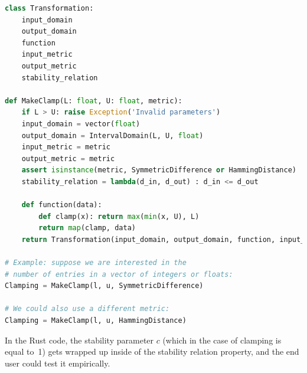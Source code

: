 \documentclass[11pt,a4paper]{article}
\theoremstyle{definition}
\newcommand{\din}{\texttt{d\_in}}
\newcommand{\dout}{\texttt{d\_out}}
\newcommand{\silvia}[1]{{ {\color{blue}{(silvia)~#1}}}}
\begin{document}
\begin{lstlisting}[language=Python]
class Transformation:
    input_domain
    output_domain
    function
    input_metric
    output_metric
    stability_relation 

def MakeClamp(L: float, U: float, metric):
    if L > U: raise Exception('Invalid parameters')
    input_domain = vector(float) 
    output_domain = IntervalDomain(L, U, float)
    input_metric = metric
    output_metric = metric
    assert isinstance(metric, SymmetricDifference or HammingDistance)
    stability_relation = lambda(d_in, d_out) : d_in <= d_out
    
    def function(data):
        def clamp(x): return max(min(x, U), L)
        return map(clamp, data) 
    return Transformation(input_domain, output_domain, function, input_metric, output_metric, stability_relation)

# Example: suppose we are interested in the 
# number of entries in a vector of integers or floats:
Clamping = MakeClamp(l, u, SymmetricDifference)

# We could also use a different metric:
Clamping = MakeClamp(l, u, HammingDistance)
\end{lstlisting}



\smallskip




In the Rust code, the stability parameter $c$ (which in the case of clamping is equal to~1) gets wrapped up inside of the stability relation property, and the end user could test it empirically.
\end{document}
